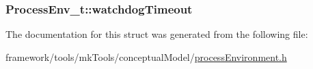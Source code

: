 \subsubsection[{\texorpdfstring{watchdog\+Timeout}{watchdogTimeout}}]{ Process\+Env\+\_\+t\+::watchdog\+Timeout}\hypertarget{struct_process_env__t_ae254647826f17492fc60581a5e6e933b}{}\label{struct_process_env__t_ae254647826f17492fc60581a5e6e933b}


The documentation for this struct was generated from the following file\+:\begin{DoxyCompactItemize}
\item 
framework/tools/mk\+Tools/conceptual\+Model/\hyperlink{process_environment_8h}{process\+Environment.\+h}\end{DoxyCompactItemize}
